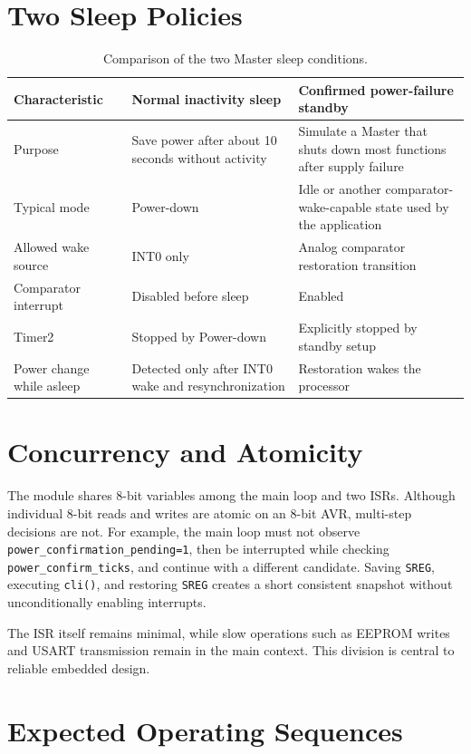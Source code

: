 \documentclass[11pt,a4paper]{article}
\begin{document}
\section{Two Sleep Policies}

\begin{table}[H]
\centering
\caption{Comparison of the two Master sleep conditions.}
\begin{tabular}{p{}p{}p{}}
\toprule
Characteristic & Normal inactivity sleep & Confirmed power-failure standby \\
\midrule
Purpose & Save power after about 10 seconds without activity & Simulate a Master that shuts down most functions after supply failure \\
Typical mode & Power-down & Idle or another comparator-wake-capable state used by the application \\
Allowed wake source & INT0 only & Analog comparator restoration transition \\
Comparator interrupt & Disabled before sleep & Enabled \\
Timer2 & Stopped by Power-down & Explicitly stopped by standby setup \\
Power change while asleep & Detected only after INT0 wake and resynchronization & Restoration wakes the processor \\
\bottomrule
\end{tabular}
\end{table}

\section{Concurrency and Atomicity}
The module shares 8-bit variables among the main loop and two ISRs. Although individual 8-bit reads and writes are atomic on an 8-bit AVR, multi-step decisions are not. For example, the main loop must not observe \texttt{power\_confirmation\_pending=1}, then be interrupted while checking \texttt{power\_confirm\_ticks}, and continue with a different candidate. Saving \texttt{SREG}, executing \texttt{cli()}, and restoring \texttt{SREG} creates a short consistent snapshot without unconditionally enabling interrupts.

The ISR itself remains minimal, while slow operations such as EEPROM writes and USART transmission remain in the main context. This division is central to reliable embedded design.

\section{Expected Operating Sequences}
\end{document}
